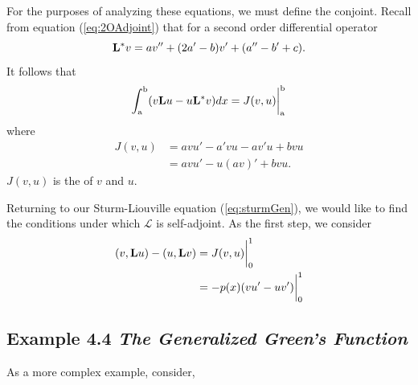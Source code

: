     For the purposes of analyzing these equations, we must define the conjoint. Recall from equation (\ref{eq:2OAdjoint}) that for a second order differential operator
    \begin{equation*}
        \mathrm{\bf{L^*}} v = av''+(2a'-b)v'+(a''-b'+c).
    \end{equation*}
    It follows that 
    \begin{equation*}
        \int_\mathrm{a}^\mathrm{b} (v\mathrm{\bf{L}} u - u\mathrm{\bf{L^*}} v)dx = J(v,u)\biggr\rvert_{\mathrm{a}}^{\mathrm{b}}
    \end{equation*}
    where
    \begin{equation*}
        \begin{split}
            J(v,u) &= avu'-a'vu-av'u + bvu\\
            &=avu'- u(av)' +bvu.
        \end{split}
    \end{equation*}
    \(J(v,u)\) is the  of \(v\) and \(u\).

    Returning to our Sturm-Liouville equation (\ref{eq:sturmGen}), we would like to find the conditions under which \(\mathcal{L}\) is self-adjoint. As the first step, we consider
    \begin{equation*}
        \begin{split}
            (v,\mathrm{\bf{L}} u)-(u, \mathrm{\bf{L}} v) &= J(v,u)\biggr\rvert_{0}^{1} \\
            &= -p(x)(vu'-uv')\biggr\rvert_{0}^{1}\\
        \end{split}
    \end{equation*}

\subsection{Example 4.4 \textit{The Generalized Green's Function}}
    As a more complex example, consider, 